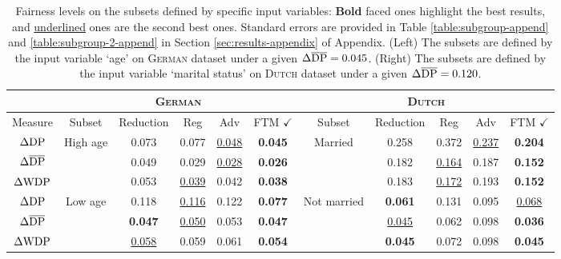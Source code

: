 \documentclass[10pt]{article} %
\begin{document}
\begin{table}[h]
    \footnotesize
    \centering
    \caption{
    Fairness levels on the subsets defined by specific input variables:
    \textbf{Bold} faced ones highlight the best results, and \underline{underlined} ones are the second best ones.
    Standard errors are provided in Table \ref{table:subgroup-append} and \ref{table:subgroup-2-append} in Section \ref{sec:results-appendix} of Appendix.
    (Left) The subsets are defined by the input variable `age' on \textsc{German} dataset under a given $\Delta \overline{\textup{DP}} = 0.045$.
    (Right) The subsets are defined by the input variable `marital status' on \textsc{Dutch} dataset under a given $\Delta \overline{\textup{DP}} = 0.120$.
    }
    \label{table:subgroup}
    \begin{tabular}{c||c|c|c|c|c|c|c|c|c|c}
        \toprule
        & \multicolumn{5}{c|}{\textsc{German}} & \multicolumn{5}{c}{\textsc{Dutch}}
        \\
        \midrule
        Measure & Subset & Reduction & Reg & Adv & FTM $\checkmark$ & Subset & Reduction & Reg & Adv & FTM $\checkmark$
        \\
        \midrule
        \midrule
        $\Delta \textup{DP}$ & \multirow{3}{*}{High age} & 0.073 & 0.077 & \underline{0.048} & \textbf{0.045} & \multirow{3}{*}{Married} & 0.258 & 0.372  & \underline{0.237}  & \textbf{0.204} 
        \\
        $\Delta \overline{\textup{DP}}$ & & 0.049 & 0.029 & \underline{0.028} & \textbf{0.026} & & 0.182  & \underline{0.164}  & 0.187  & \textbf{0.152} 
        \\
        $\Delta \textup{WDP}$ & & 0.053 & \underline{0.039} & 0.042 & \textbf{0.038} & & 0.183 & \underline{0.172}  & 0.193  & \textbf{0.152} 
        \\
        \midrule
        $\Delta \textup{DP}$ & \multirow{3}{*}{Low age} & 0.118 & \underline{0.116} & 0.122 & \textbf{0.077} & \multirow{3}{*}{Not married} & \textbf{0.061}  & 0.131  & 0.095  & \underline{0.068} 
        \\
        $\Delta \overline{\textup{DP}}$ & & \textbf{0.047} & \underline{0.050} & 0.053 & \textbf{0.047} & & \underline{0.045}  & 0.062  & 0.098  & \textbf{0.036} 
        \\
        $\Delta \textup{WDP}$ & & \underline{0.058} & 0.059 & 0.061 & \textbf{0.054} & & \textbf{0.045}  & 0.072  & 0.098  & \textbf{0.045} 

\end{tabular}
\end{table}
\end{document}
